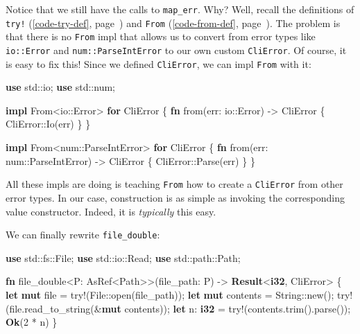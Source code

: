 \documentclass[a4paper,]{book}
\renewcommand*{\hyperref}[2][\ar]{%
  \def\ar{#2}%
  #2 (\autoref{#1}, page~\pageref{#1})}
\newenvironment{Shaded}{\begin{snugshade}}{\end{snugshade}}
\newcommand{\KeywordTok}[1]{\textcolor[rgb]{0.13,0.29,0.53}{\textbf{{#1}}}}
\newcommand{\DecValTok}[1]{\textcolor[rgb]{0.00,0.00,0.81}{{#1}}}
\newcommand{\OtherTok}[1]{\textcolor[rgb]{0.56,0.35,0.01}{{#1}}}
\newcommand{\NormalTok}[1]{{#1}}
\begin{document}
Notice that we still have the calls to \texttt{map\_err}. Why? Well,
recall the definitions of \hyperref[code-try-def]{\texttt{try!}} and
\hyperref[code-from-def]{\texttt{From}}. The problem is that there is no
\texttt{From} impl that allows us to convert from error types like
\texttt{io::Error} and \texttt{num::ParseIntError} to our own custom
\texttt{CliError}. Of course, it is easy to fix this! Since we defined
\texttt{CliError}, we can impl \texttt{From} with it:

\begin{Shaded}
\begin{Highlighting}[]
\KeywordTok{use} \NormalTok{std::io;}
\KeywordTok{use} \NormalTok{std::num;}

\KeywordTok{impl} \NormalTok{From<io::Error> }\KeywordTok{for} \NormalTok{CliError \{}
    \KeywordTok{fn} \NormalTok{from(err: io::Error) -> CliError \{}
        \NormalTok{CliError::Io(err)}
    \NormalTok{\}}
\NormalTok{\}}

\KeywordTok{impl} \NormalTok{From<num::ParseIntError> }\KeywordTok{for} \NormalTok{CliError \{}
    \KeywordTok{fn} \NormalTok{from(err: num::ParseIntError) -> CliError \{}
        \NormalTok{CliError::Parse(err)}
    \NormalTok{\}}
\NormalTok{\}}
\end{Highlighting}
\end{Shaded}

All these impls are doing is teaching \texttt{From} how to create a
\texttt{CliError} from other error types. In our case, construction is
as simple as invoking the corresponding value constructor. Indeed, it is
\emph{typically} this easy.

We can finally rewrite \texttt{file\_double}:

\begin{Shaded}
\begin{Highlighting}[]

\KeywordTok{use} \NormalTok{std::fs::File;}
\KeywordTok{use} \NormalTok{std::io::Read;}
\KeywordTok{use} \NormalTok{std::path::Path;}

\KeywordTok{fn} \NormalTok{file_double<P: AsRef<Path>>(file_path: P) -> }\KeywordTok{Result}\NormalTok{<}\KeywordTok{i32}\NormalTok{, CliError> \{}
    \KeywordTok{let} \KeywordTok{mut} \NormalTok{file = }\OtherTok{try!}\NormalTok{(File::open(file_path));}
    \KeywordTok{let} \KeywordTok{mut} \NormalTok{contents = String::new();}
    \OtherTok{try!}\NormalTok{(file.read_to_string(&}\KeywordTok{mut} \NormalTok{contents));}
    \KeywordTok{let} \NormalTok{n: }\KeywordTok{i32} \NormalTok{= }\OtherTok{try!}\NormalTok{(contents.trim().parse());}
    \KeywordTok{Ok}\NormalTok{(}\DecValTok{2} \NormalTok{* n)}
\NormalTok{\}}
\end{Highlighting}
\end{Shaded}
\end{document}

